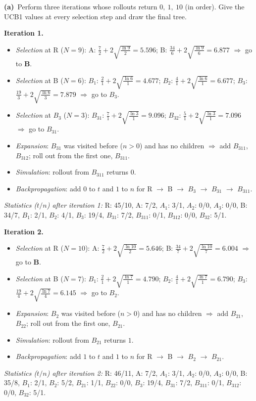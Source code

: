 \documentclass[11pt,a4paper]{article}
\newcommand{\subq}[1]{\par\smallskip\noindent\textbf{#1}\ }
\begin{document}
\subq{(a)}Perform three iterations whose rollouts return $0,\ 1,\ 10$ (in order). Give the UCB1 values at every selection step and draw the final tree.
\begin{solbox}
\textbf{Iteration 1.}
\begin{itemize}[leftmargin=1.5em,itemsep=1pt]
\item \emph{Selection} at R ($N=9$): A: $\frac{7}{2} + 2\sqrt{\frac{\ln 9}{2}} = 5.596$; B: $\frac{34}{6} + 2\sqrt{\frac{\ln 9}{6}} = 6.877$ $\Rightarrow$ go to \textbf{B}.
\item \emph{Selection} at B ($N=6$): $B_{1}$: $\frac{2}{1} + 2\sqrt{\frac{\ln 6}{1}} = 4.677$; $B_{2}$: $\frac{4}{1} + 2\sqrt{\frac{\ln 6}{1}} = 6.677$; $B_{3}$: $\frac{19}{3} + 2\sqrt{\frac{\ln 6}{3}} = 7.879$ $\Rightarrow$ go to \textbf{$B_{3}$}.
\item \emph{Selection} at $B_{3}$ ($N=3$): $B_{31}$: $\frac{7}{1} + 2\sqrt{\frac{\ln 3}{1}} = 9.096$; $B_{32}$: $\frac{5}{1} + 2\sqrt{\frac{\ln 3}{1}} = 7.096$ $\Rightarrow$ go to \textbf{$B_{31}$}.
\item \emph{Expansion}: $B_{31}$ was visited before ($n>0$) and has no children $\Rightarrow$ add $B_{311}$, $B_{312}$; roll out from the first one, \textbf{$B_{311}$}.
\item \emph{Simulation}: rollout from $B_{311}$ returns $0$.
\item \emph{Backpropagation}: add $0$ to $t$ and $1$ to $n$ for R $\to$ B $\to$ $B_{3}$ $\to$ $B_{31}$ $\to$ $B_{311}$.
\end{itemize}
\textit{Statistics ($t/n$) after iteration 1:} R: 45/10, A: 7/2, $A_{1}$: 3/1, $A_{2}$: 0/0, $A_{3}$: 0/0, B: 34/7, $B_{1}$: 2/1, $B_{2}$: 4/1, $B_{3}$: 19/4, $B_{31}$: 7/2, $B_{311}$: 0/1, $B_{312}$: 0/0, $B_{32}$: 5/1.

\smallskip
\textbf{Iteration 2.}
\begin{itemize}[leftmargin=1.5em,itemsep=1pt]
\item \emph{Selection} at R ($N=10$): A: $\frac{7}{2} + 2\sqrt{\frac{\ln 10}{2}} = 5.646$; B: $\frac{34}{7} + 2\sqrt{\frac{\ln 10}{7}} = 6.004$ $\Rightarrow$ go to \textbf{B}.
\item \emph{Selection} at B ($N=7$): $B_{1}$: $\frac{2}{1} + 2\sqrt{\frac{\ln 7}{1}} = 4.790$; $B_{2}$: $\frac{4}{1} + 2\sqrt{\frac{\ln 7}{1}} = 6.790$; $B_{3}$: $\frac{19}{4} + 2\sqrt{\frac{\ln 7}{4}} = 6.145$ $\Rightarrow$ go to \textbf{$B_{2}$}.
\item \emph{Expansion}: $B_{2}$ was visited before ($n>0$) and has no children $\Rightarrow$ add $B_{21}$, $B_{22}$; roll out from the first one, \textbf{$B_{21}$}.
\item \emph{Simulation}: rollout from $B_{21}$ returns $1$.
\item \emph{Backpropagation}: add $1$ to $t$ and $1$ to $n$ for R $\to$ B $\to$ $B_{2}$ $\to$ $B_{21}$.
\end{itemize}
\textit{Statistics ($t/n$) after iteration 2:} R: 46/11, A: 7/2, $A_{1}$: 3/1, $A_{2}$: 0/0, $A_{3}$: 0/0, B: 35/8, $B_{1}$: 2/1, $B_{2}$: 5/2, $B_{21}$: 1/1, $B_{22}$: 0/0, $B_{3}$: 19/4, $B_{31}$: 7/2, $B_{311}$: 0/1, $B_{312}$: 0/0, $B_{32}$: 5/1.


\end{solbox}
\end{document}
